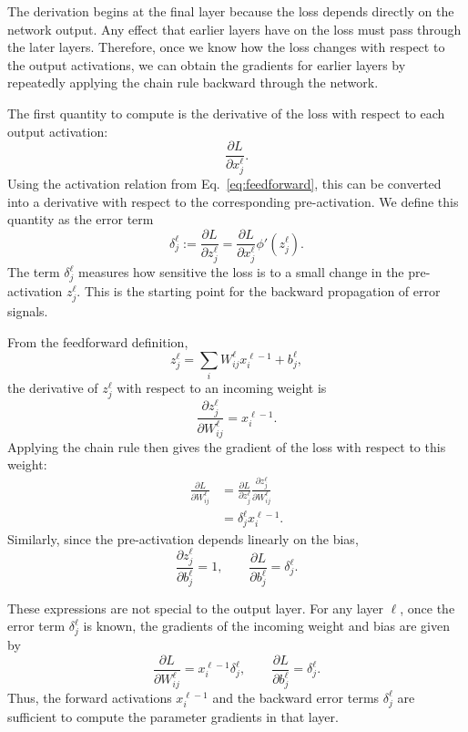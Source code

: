 The derivation begins at the final layer because the loss depends directly on the network output. Any effect that earlier layers have on the loss must pass through the later layers. Therefore, once we know how the loss changes with respect to the output activations, we can obtain the gradients for earlier layers by repeatedly applying the chain rule backward through the network.

The first quantity to compute is the derivative of the loss with respect to each output activation:
\[
    \frac{\partial L}{\partial x_j^{\ell}}.
\]
Using the activation relation from Eq.~\eqref{eq:feedforward}, this can be converted into a derivative with respect to the corresponding pre-activation. We define this quantity as the error term
\begin{equation}
\delta_j^{\ell}
    :=
    \frac{\partial L}{\partial z_j^{\ell}}
    =
    \frac{\partial L}{\partial x_j^{\ell}}
    \phi'(z_j^{\ell}).
\label{eq:dLdz}
\end{equation}
The term \(\delta_j^{\ell}\) measures how sensitive the loss is to a small change in the pre-activation \(z_j^\ell\). This is the starting point for the backward propagation of error signals.

From the feedforward definition,
\[
z_j^\ell
=
\sum_i W_{ij}^\ell x_i^{\ell-1} + b_j^\ell,
\]
the derivative of \(z_j^\ell\) with respect to an incoming weight is
\[
\frac{\partial z_j^\ell}{\partial W_{ij}^\ell}
=
x_i^{\ell-1}.
\]
Applying the chain rule then gives the gradient of the loss with respect to this weight:
\begin{align}
\frac{\partial L}{\partial W_{ij}^{\ell}}
&=
\frac{\partial L}{\partial z_j^{\ell}}
\frac{\partial z_j^{\ell}}{\partial W_{ij}^{\ell}} \\
&=
\delta_j^{\ell} x_i^{\ell-1}.
\label{eq:dLdw}
\end{align}
Similarly, since the pre-activation depends linearly on the bias,
\[
\frac{\partial z_j^\ell}{\partial b_j^\ell}
=
1,
\qquad
\frac{\partial L}{\partial b_j^\ell}
=
\delta_j^\ell.
\]

These expressions are not special to the output layer. For any layer \(\ell\), once the error term \(\delta_j^\ell\) is known, the gradients of the incoming weight and bias are given by
\[
\frac{\partial L}{\partial W_{ij}^{\ell}}
=
x_i^{\ell-1}\delta_j^\ell,
\qquad
\frac{\partial L}{\partial b_j^\ell}
=
\delta_j^\ell.
\]
Thus, the forward activations \(x_i^{\ell-1}\) and the backward error terms \(\delta_j^\ell\) are sufficient to compute the parameter gradients in that layer.

